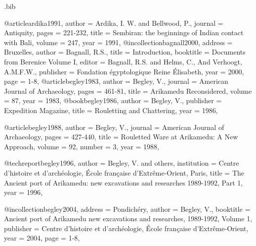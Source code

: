 \begin{filecontents}{\IJSRAidentifier.bib}

@article{ardika1991,
	author = {Ardika, I. W. and Bellwood, P.},
	journal = {Antiquity},
	pages = {221-232},
	title = {Sembiran: the beginnings of Indian contact with Bali},
	volume = {247},
	year = {1991},
}
@incollection{bagnall2000,
	address = {Bruxelles},
	author = {Bagnall, R.S.},
	title = {Introduction},
	booktitle = {Documents from Berenice Volume I},
	editor = {Bagnall, R.S. and Helms, C., And Verhoogt, A.M.F.W.},
	publisher = {Fondation égyptologique Reine Élisabeth},
	year = {2000},
	page = {1-8},
}
@article{begley1983,
	author = {Begley, V.},
	journal = {American Journal of Archaeology},
	pages = {461-81},
	title = {Arikamedu Reconsidered},
	volume = {87},
	year = {1983},
}
@book{begley1986,
	author = {Begley, V.},
	publisher = {Expedition Magazine},
	title = {Rouletting and Chattering},
	year = {1986},
}

@article{begley1988,
	author = {Begley, V.},
	journal = {American Journal of Archaeology},
	pages = {427-440},
	title = {Rouletted Ware at Arikamedu: A New Approach},
	volume = {92},
	number = {3},
	year = {1988},
}

@techreport{begley1996,
	author = {Begley, V. and others},
	institution = {Centre d'histoire et d'archéologie, École française d'Extrême-Orient, Paris},
	title = {The Ancient port of Arikamedu: new excavations and researches 1989-1992, Part 1},
	year = {1996},
}

@incollection{begley2004,
	address = {Pondichéry},
	author = {Begley, V.},
	booktitle = {Ancient port of Arikamedu new excavations and researches, 1989-1992, Volume 1},
	publisher = {Centre d'histoire et d'archéologie, École française d'Extrême-Orient},
	year = {2004},
	page = {1-8},
}


\end{filecontents}
